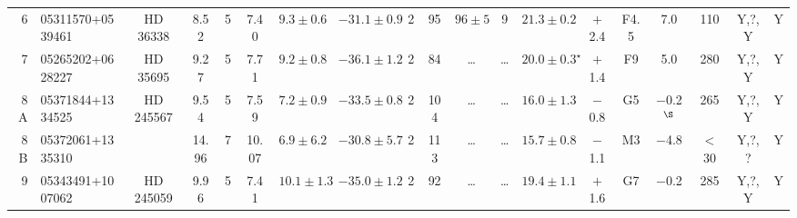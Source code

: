 \documentclass[usenatbib]{mnras}
\begin{document}
\begin{landscape}
\begin{table}
\begin{tabular}{r l c c c c c c c c c c c c c c c c c}
6 & 05311570+0539461   &   HD 36338                                              &   8.52     &    5         &      7.40                &         $9.3\pm0.6$                  &   $-31.1\pm0.9$           &    2     &    95                  &   $96\pm5$            &   9             &       $21.3\pm0.2$              &   $+$2.4                                 &   F4.5     &   7.0                             &   110                               &   Y,?,Y                       &   Y\\
7 & 05265202+0628227   &   HD 35695                                              &   9.27     &    5         &      7.71                &         $9.2\pm0.8$                  &   $-36.1\pm1.2$           &    2     &    84                  & \dots                      &   \dots       &          $20.0\pm0.3^{\star}$ &   $+$1.4                                 &   F9        &   5.0                             &   280                               &   Y,?,Y                       &   Y\\
8A& 05371844+1334525   &   HD 245567                                           &   9.54     &    5         &      7.59                &         $7.2\pm0.9$                  &   $-33.5\pm0.8$           &    2     &   104                 & \dots                      &   \dots       &          $16.0\pm1.3$          &   $-$0.8                                  &   G5       &   $-$0.2$^{\S}$                       &   265                               &   Y,?,Y                       &   Y\\
8B& 05372061+1335310   &                                                                &  14.96    &    7         &   10.07                 &            $6.9\pm6.2$                &    $-30.8\pm5.7$          &    2     &    113               & \dots                      &   \dots       &            $15.7\pm0.8$         &   $-$1.1                                  &   M3     &   $-$4.8                       &   $<$30                           &   Y,?,?                       &   Y\\
9 & 05343491+1007062   &   HD 245059                                            &   9.96     &    5        &      7.41                 &         $10.1\pm1.3$                 &   $-35.0\pm1.2$           &     2     &   92                 & \dots                      &   \dots       &          $19.4\pm1.1$           &   $+$1.6                                 &   G7      &   $-$0.2                       &   285                               &   Y,?,Y                       &   Y\\

\end{tabular}
\end{table}
\end{landscape}
\end{document}
